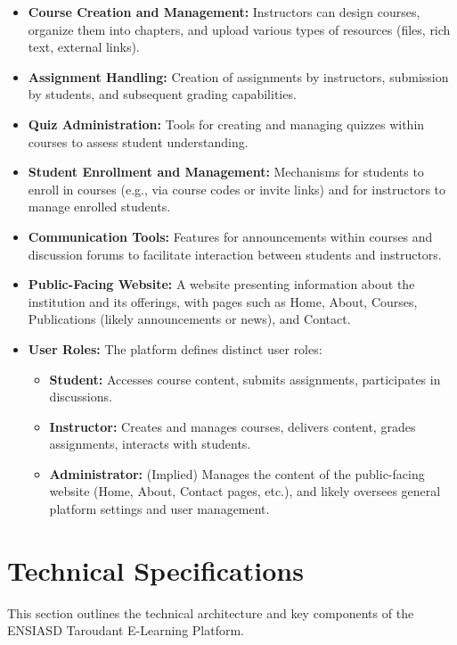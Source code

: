 \begin{itemize}
    \item \textbf{Course Creation and Management:} Instructors can design courses, organize them into chapters, and upload various types of resources (files, rich text, external links).
    \item \textbf{Assignment Handling:} Creation of assignments by instructors, submission by students, and subsequent grading capabilities.
    \item \textbf{Quiz Administration:} Tools for creating and managing quizzes within courses to assess student understanding.
    \item \textbf{Student Enrollment and Management:} Mechanisms for students to enroll in courses (e.g., via course codes or invite links) and for instructors to manage enrolled students.
    \item \textbf{Communication Tools:} Features for announcements within courses and discussion forums to facilitate interaction between students and instructors.
    \item \textbf{Public-Facing Website:} A website presenting information about the institution and its offerings, with pages such as Home, About, Courses, Publications (likely announcements or news), and Contact.
    \item \textbf{User Roles:} The platform defines distinct user roles:
    \begin{itemize}
        \item \textbf{Student:} Accesses course content, submits assignments, participates in discussions.
        \item \textbf{Instructor:} Creates and manages courses, delivers content, grades assignments, interacts with students.
        \item \textbf{Administrator:} (Implied) Manages the content of the public-facing website (Home, About, Contact pages, etc.), and likely oversees general platform settings and user management.
    \end{itemize}
\end{itemize}

\section*{Technical Specifications}

This section outlines the technical architecture and key components of the ENSIASD Taroudant E-Learning Platform.


